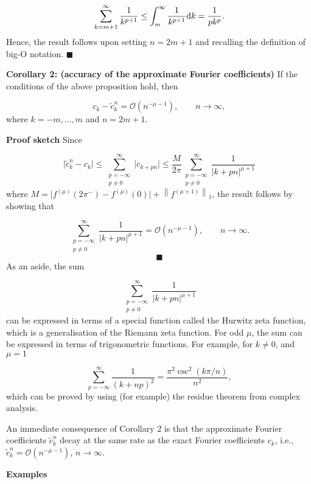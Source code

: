 \documentclass[12pt,a4paper]{article}
\begin{document}
\[
\sum_{k = m+1}^{\infty}  \frac{1}{k^{p+1}}  \leq \int_{m}^{\infty} \frac{1}{k^{p+1}}{\rm d}k = \frac{1}{pk^p}.
\]
Hence, the result follows upon setting $n = 2m + 1$ and recalling the definition of big-O notation.   $\blacksquare$

\textbf{Corollary 2: (accuracy of the approximate Fourier coefficients)} If the conditions of the above proposition hold, then

\[
c_k - \tilde{c}^n_{k} = \mathcal{O}\left( n^{-\mu-1} \right), \qquad n \to \infty,
\]
where $k = -m, \ldots, m$ and $n = 2m + 1$.

\textbf{Proof sketch} Since

\[
\vert \tilde{c}^n_k - c_k \vert \leq  \sum_{\substack{p=-\infty\\ p\neq 0}}^{\infty} \vert c_{k+pn} \vert \leq  \frac{M}{2\pi} \sum_{\substack{p=-\infty\\ p\neq 0}}^{\infty}  \frac{1}{\vert k + pn \vert^{\mu+1}}
\]
where $M  = \vert f^{(\mu)}(2\pi^{-}) - f^{(\mu)}(0)   \vert + \left\|f^{(\mu+1)}   \right\|_1$,  the result follows by showing that

\[
\sum_{\substack{p=-\infty\\ p\neq 0}}^{\infty}  \frac{1}{\vert k + pn \vert^{\mu+1}} = \mathcal{O}(n^{-\mu-1}), \qquad n \to \infty.
\]
\[
\blacksquare
\]
As an aside, the sum 

\[
\sum_{\substack{p=-\infty\\ p\neq 0}}^{\infty}  \frac{1}{\vert k + pn \vert^{\mu+1}}
\]
can be expressed in terms of a special function called the Hurwitz zeta function, which is a generalisation of the Riemann zeta function.  For odd $\mu$, the sum can be expressed in terms of trigonometric functions.  For example, for $k \neq 0$, and $\mu = 1$

\[
    \sum_{p=-\infty}^{\infty} \frac{1}{(k+np)^2} = \frac{\pi^2\csc^2(k\pi/n) }{n^2},
\]
which can be proved by using (for example) the residue theorem from complex analysis.

An immediate consequence of Corollary 2 is that the approximate Fourier coefficients $\tilde{c}^n_k$ decay at the same rate as the exact Fourier coefficients $c_k$, i.e., $\tilde{c}^n_k = \mathcal{O}(n^{-\mu-1})$, $n \to \infty$.

\textbf{Examples}  
\end{document}
